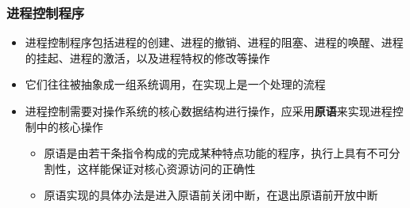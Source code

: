 \documentclass[cs4size,a4paper,10pt]{ctexart}
\begin{document}
	\subsubsection{进程控制程序}
	\begin{itemize}
		\item 进程控制程序包括进程的创建、进程的撤销、进程的阻塞、进程的唤醒、进程的挂起、进程的激活，以及进程特权的修改等操作
		\item 它们往往被抽象成一组系统调用，在实现上是一个处理的流程
		\item 进程控制需要对操作系统的核心数据结构进行操作，应采用\textbf{原语}来实现进程控制中的核心操作
		\begin{itemize}
			\item 原语是由若干条指令构成的完成某种特点功能的程序，执行上具有不可分割性，这样能保证对核心资源访问的正确性
			\item 原语实现的具体办法是进入原语前关闭中断，在退出原语前开放中断
		\end{itemize}
	\end{itemize}
	
\end{document}
